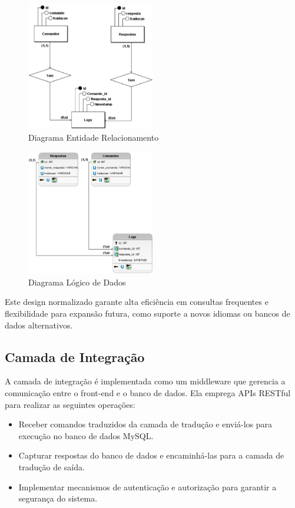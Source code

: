 \begin{figure}[H]
    \centering
    \includegraphics[width=0.5\textwidth]{figuras/Conceitual_1.eps}
    \caption{Diagrama Entidade Relacionamento}
    \label{fig:Diagrama Entidade Relacionamento}
\end{figure}

\begin{figure}[H]
    \centering
    \includegraphics[width=0.5\textwidth]{figuras/Logico_1.eps}
    \caption{Diagrama Lógico de Dados}
    \label{fig:Diagrama Logico de Dados}
\end{figure}

Este design normalizado garante alta eficiência em consultas frequentes e flexibilidade para expansão futura, como suporte a novos idiomas ou bancos de dados alternativos.

\subsection{Camada de Integração}
A camada de integração é implementada como um middleware que gerencia a comunicação entre o front-end e o banco de dados. Ela emprega APIs RESTful para realizar as seguintes operações:

\begin{itemize}
    \item Receber comandos traduzidos da camada de tradução e enviá-los para execução no banco de dados MySQL.
    \item Capturar respostas do banco de dados e encaminhá-las para a camada de tradução de saída.
    \item Implementar mecanismos de autenticação e autorização para garantir a segurança do sistema.
\end{itemize}

